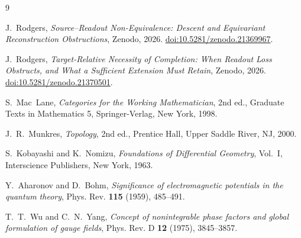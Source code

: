 \documentclass[11pt,reqno]{amsart}
\theoremstyle{plain}
\theoremstyle{definition}
\theoremstyle{remark}
\numberwithin{equation}{section}
\begin{document}
\begin{thebibliography}{9}

J.~Rodgers,
\emph{Source--Readout Non-Equivalence: Descent and Equivariant Reconstruction Obstructions},
Zenodo, 2026.
\href{https://doi.org/10.5281/zenodo.21369967}{doi:10.5281/zenodo.21369967}.

J.~Rodgers,
\emph{Target-Relative Necessity of Completion: When Readout Loss Obstructs, and What a Sufficient
Extension Must Retain},
Zenodo, 2026.
\href{https://doi.org/10.5281/zenodo.21370501}{doi:10.5281/zenodo.21370501}.

S.~Mac~Lane,
\emph{Categories for the Working Mathematician},
2nd ed., Graduate Texts in Mathematics 5, Springer-Verlag, New York, 1998.

J.~R.~Munkres,
\emph{Topology},
2nd ed., Prentice Hall, Upper Saddle River, NJ, 2000.

S.~Kobayashi and K.~Nomizu,
\emph{Foundations of Differential Geometry}, Vol.~I,
Interscience Publishers, New York, 1963.

Y.~Aharonov and D.~Bohm,
\emph{Significance of electromagnetic potentials in the quantum theory},
Phys. Rev. \textbf{115} (1959), 485--491.

T.~T.~Wu and C.~N.~Yang,
\emph{Concept of nonintegrable phase factors and global formulation of gauge fields},
Phys. Rev. D \textbf{12} (1975), 3845--3857.

\end{thebibliography}
\end{document}
